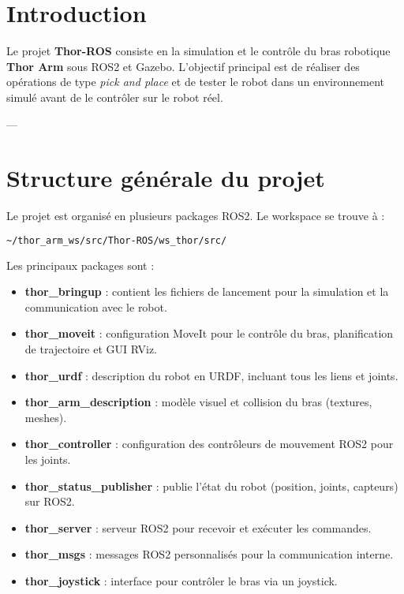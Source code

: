 \documentclass[a4paper,12pt]{article}
\numberwithin{equation}{section}
\begin{document}
\tableofcontents
\newpage

\section{Introduction}
Le projet \textbf{Thor-ROS} consiste en la simulation et le contrôle du bras robotique \textbf{Thor Arm} sous ROS2 et Gazebo.  
L'objectif principal est de réaliser des opérations de type \textit{pick and place} et de tester le robot dans un environnement simulé avant de le contrôler sur le robot réel.  

---

\section{Structure générale du projet}

Le projet est organisé en plusieurs packages ROS2. Le workspace se trouve à :

\begin{lstlisting}[language=bash]
~/thor_arm_ws/src/Thor-ROS/ws_thor/src/
\end{lstlisting}

Les principaux packages sont :

\begin{itemize}
    \item \textbf{thor\_bringup} : contient les fichiers de lancement pour la simulation et la communication avec le robot.
    \item \textbf{thor\_moveit} : configuration MoveIt pour le contrôle du bras, planification de trajectoire et GUI RViz.
    \item \textbf{thor\_urdf} : description du robot en URDF, incluant tous les liens et joints.
    \item \textbf{thor\_arm\_description} : modèle visuel et collision du bras (textures, meshes).
    \item \textbf{thor\_controller} : configuration des contrôleurs de mouvement ROS2 pour les joints.
    \item \textbf{thor\_status\_publisher} : publie l'état du robot (position, joints, capteurs) sur ROS2.
    \item \textbf{thor\_server} : serveur ROS2 pour recevoir et exécuter les commandes.
    \item \textbf{thor\_msgs} : messages ROS2 personnalisés pour la communication interne.
    \item \textbf{thor\_joystick} : interface pour contrôler le bras via un joystick.
\end{itemize}
\end{document}
